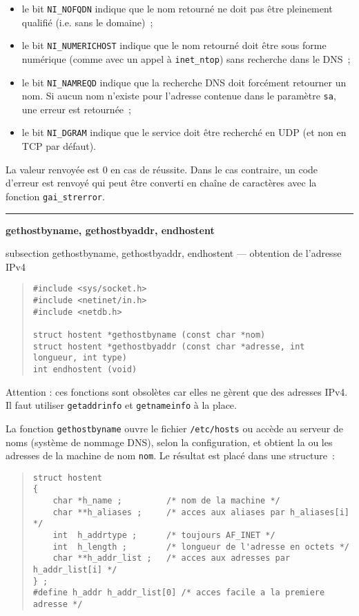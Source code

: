 \documentclass [twoside] {report}
\newcommand {\primitive} [1]
    {
	{\large \bf #1}
	\addcontentsline {toc} {subsection} {#1}
    }
\newcommand {\separation}
    {
	\vspace {7mm}
	\nopagebreak
	\hrule
    }
\begin{document}
\begin {itemize}
    \item le bit \texttt {NI\_NOFQDN} indique que le nom retourné
	ne doit pas être pleinement qualifié (i.e. sans le domaine)~;

    \item le bit \texttt {NI\_NUMERICHOST} indique que le nom
	retourné doit être sous forme numérique (comme avec un appel
	à \texttt {inet\_ntop}) sans recherche dans le DNS~;

    \item le bit \texttt {NI\_NAMREQD} indique que la recherche
	DNS doit forcément retourner un nom. Si aucun nom n'existe
	pour l'adresse contenue dans le paramètre \texttt {sa}, une
	erreur est retournée~;

    \item le bit \texttt {NI\_DGRAM} indique que le service doit
	être recherché en UDP (et non en TCP par défaut).

\end {itemize}

La valeur renvoyée est 0 en cas de réussite. Dans le cas contraire,
un code d'erreur est renvoyé qui peut être converti en chaîne de
caractères avec la fonction \texttt {gai\_strerror}.


\separation
\primitive {gethostbyname, gethostbyaddr,
endhostent} --- obtention de l'adresse IPv4

\begin {quote}
\begin {verbatim}
#include <sys/socket.h>
#include <netinet/in.h>
#include <netdb.h>

struct hostent *gethostbyname (const char *nom)
struct hostent *gethostbyaddr (const char *adresse, int longueur, int type)
int endhostent (void)
\end{verbatim}
\end {quote}

Attention : ces fonctions sont obsolètes car elles ne gèrent que
des adresses IPv4. Il faut utiliser \texttt {getaddrinfo} et \texttt
{getnameinfo} à la place.

La fonction {\tt gethostbyname} ouvre le fichier {\tt /etc/hosts}
ou accède au serveur de noms (système de nommage DNS), selon la
configuration, et obtient la ou les adresses de la machine de nom
{\tt nom}. Le résultat est placé dans une structure~:

\begin {quote}
    \small
\begin {verbatim}
struct hostent
{
    char *h_name ;         /* nom de la machine */
    char **h_aliases ;     /* acces aux aliases par h_aliases[i] */
    int  h_addrtype ;      /* toujours AF_INET */
    int  h_length ;        /* longueur de l'adresse en octets */
    char **h_addr_list ;   /* acces aux adresses par h_addr_list[i] */
} ;
#define h_addr h_addr_list[0] /* acces facile a la premiere adresse */
\end{verbatim}
\end {quote}
\end{document}
